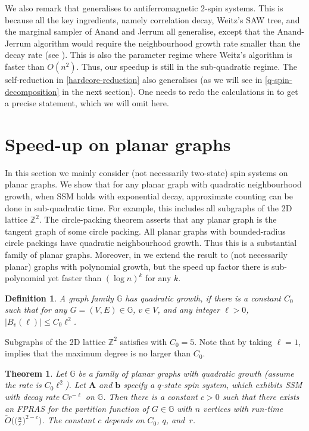 \documentclass[10pt,a4paper]{article}
\newtheorem{theorem}{Theorem}[section]
\newtheorem{definition}{Definition}[section]
\def\=#1{\mathbb{#1}}
\newcommand{\abs}[1]{\ensuremath{\left\vert#1\right\vert}}
\newcommand{\eps}{\varepsilon}
\begin{document}
We also remark that  generalises to antiferromagnetic 2-spin systems.
This is because all the key ingredients, namely correlation decay, Weitz's SAW tree, and the marginal sampler of Anand and Jerrum all generalise,
except that the Anand-Jerrum algorithm would require the neighbourhood growth rate smaller than the decay rate (see ).
This is also the parameter regime where Weitz's algorithm is faster than $O(n^2)$.
Thus, our speedup is still in the sub-quadratic regime.
The self-reduction in \eqref{hardcore-reduction} also generalises (as we will see in \eqref{q-spin-decomposition} in the next section).
One needs to redo the calculations in  to get a precise statement, which we will omit here.

\section{Speed-up on planar graphs}
In this section we mainly consider (not necessarily two-state) spin systems on planar graphs.
We show that for any planar graph with quadratic neighbourhood growth,
when SSM holds with exponential decay,
approximate counting can be done in sub-quadratic time.
For example, this includes all subgraphs of the 2D lattice $\=Z^2$.
The circle-packing theorem asserts that any planar graph is the tangent graph of some circle packing.
All planar graphs with bounded-radius circle packings have quadratic neighbourhood growth.
Thus this is a substantial family of planar graphs.
Moreover, in  we extend the result to (not necessarily planar) graphs with polynomial growth,
but the speed up factor there is sub-polynomial yet faster than $(\log n)^k$ for any $k$.

\begin{definition}  \label{def:quadratic-growth}
  A graph family $\=G$ has \emph{quadratic growth},
  if there is a constant $C_0$ such that for any $G=(V,E)\in\=G$, $v\in V$, and any integer $\ell>0$,
  $\abs{B_v(\ell)}\le C_0\ell^2$.
\end{definition}

Subgraphs of the 2D lattice $\=Z^2$ satisfies  with $C_0=5$.
Note that by taking $\ell=1$,  implies that the maximum degree is no larger than $C_0$.


\begin{theorem}\label{lattice-counting}
  Let $\=G$ be a family of planar graphs with quadratic growth (assume the rate is $C_0\ell^2$).
  Let ${\mathbf{A}}$ and ${\mathbf{b}}$ specify a $q$-state spin system, which exhibits SSM with decay rate $Cr^{-\ell}$ on $\=G$.
  Then there is a constant $c>0$ such that there exists an FPRAS for the partition function of $G\in\=G$ with $n$ vertices with run-time $\widetilde{O}\big(\big(\frac{n}{\eps}\big)^{2-c}\big)$.
  The constant $c$ depends on $C_0$, $q$, and~$r$.
\end{theorem}
\end{document}
